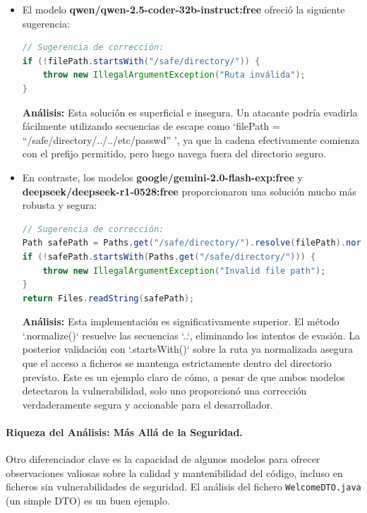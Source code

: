 \begin{itemize}
    \item El modelo \textbf{qwen/qwen-2.5-coder-32b-instruct:free} ofreció la siguiente sugerencia:
    \begin{lstlisting}[language=java,caption={Sugerencia de Qwen para Path Traversal.}]
// Sugerencia de corrección:
if (!filePath.startsWith("/safe/directory/")) {
    throw new IllegalArgumentException("Ruta inválida");
}
    \end{lstlisting}
    \textbf{Análisis:} Esta solución es superficial e insegura. Un atacante podría evadirla fácilmente utilizando secuencias de escape como `filePath = ``/safe/directory/../../etc/passwd'' ', ya que la cadena efectivamente comienza con el prefijo permitido, pero luego navega fuera del directorio seguro.

    \item En contraste, los modelos \textbf{google/gemini-2.0-flash-exp:free} y \textbf{deepseek/deepseek-r1-0528:free} proporcionaron una solución mucho más robusta y segura:
    \begin{lstlisting}[language=java,caption={Sugerencia de Gemini/DeepSeek para Path Traversal.}]
// Sugerencia de corrección:
Path safePath = Paths.get("/safe/directory/").resolve(filePath).normalize();
if (!safePath.startsWith(Paths.get("/safe/directory/"))) {
    throw new IllegalArgumentException("Invalid file path");
}
return Files.readString(safePath);
    \end{lstlisting}
    \textbf{Análisis:} Esta implementación es significativamente superior. El método `.normalize()` resuelve las secuencias `..`, eliminando los intentos de evasión. La posterior validación con `.startsWith()` sobre la ruta ya normalizada asegura que el acceso a ficheros se mantenga estrictamente dentro del directorio previsto. Este es un ejemplo claro de cómo, a pesar de que ambos modelos detectaron la vulnerabilidad, solo uno proporcionó una corrección verdaderamente segura y accionable para el desarrollador.
\end{itemize}

\paragraph{Riqueza del Análisis: Más Allá de la Seguridad.}
Otro diferenciador clave es la capacidad de algunos modelos para ofrecer observaciones valiosas sobre la calidad y mantenibilidad del código, incluso en ficheros sin vulnerabilidades de seguridad. El análisis del fichero \texttt{WelcomeDTO.java} (un simple DTO) es un buen ejemplo.

